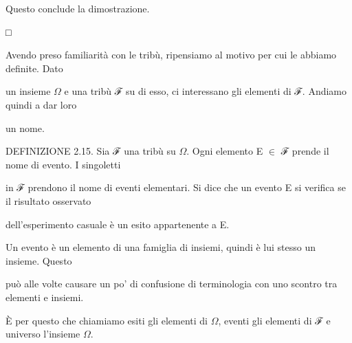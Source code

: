 \documentclass[a4paper,portrait,12pt]{article}
\begin{document}
\begin{flushleft}
Questo conclude la dimostrazione.
\end{flushleft}





□





\begin{flushleft}
Avendo preso familiarit\`{a} con le tribù, ripensiamo al motivo per cui le abbiamo definite. Dato
\end{flushleft}


\begin{flushleft}
un insieme $\Omega$ e una tribù ℱ su di esso, ci interessano gli elementi di ℱ. Andiamo quindi a dar loro
\end{flushleft}


\begin{flushleft}
un nome.
\end{flushleft}


\begin{flushleft}
DEFINIZIONE 2.15. Sia ℱ una tribù su $\Omega$. Ogni elemento E $\in$ ℱ prende il nome di evento. I singoletti
\end{flushleft}


\begin{flushleft}
in ℱ prendono il nome di eventi elementari. Si dice che un evento E si verifica se il risultato osservato
\end{flushleft}


\begin{flushleft}
dell'esperimento casuale \`{e} un esito appartenente a E.
\end{flushleft}


\begin{flushleft}
Un evento \`{e} un elemento di una famiglia di insiemi, quindi \`{e} lui stesso un insieme. Questo
\end{flushleft}


\begin{flushleft}
pu\`{o} alle volte causare un po' di confusione di terminologia con uno scontro tra elementi e insiemi.
\end{flushleft}


\begin{flushleft}
\`{E} per questo che chiamiamo esiti gli elementi di $\Omega$, eventi gli elementi di ℱ e universo l'insieme $\Omega$.
\end{flushleft}
\end{document}
